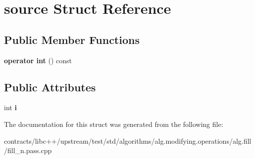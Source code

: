 \hypertarget{structsource}{}\section{source Struct Reference}
\label{structsource}
\subsection*{Public Member Functions}
\begin{DoxyCompactItemize}
\item 
\mbox{\label{structsource_a575578afa5982e4f1df7cc4b5e194e82}} 
{\bfseries operator int} () const
\end{DoxyCompactItemize}
\subsection*{Public Attributes}
\begin{DoxyCompactItemize}
\item 
\mbox{\label{structsource_aedd68f29e8cb20d51f28cd76bf6684ba}} 
int {\bfseries i}
\end{DoxyCompactItemize}


The documentation for this struct was generated from the following file\+:\begin{DoxyCompactItemize}
\item 
contracts/libc++/upstream/test/std/algorithms/alg.\+modifying.\+operations/alg.\+fill/fill\+\_\+n.\+pass.\+cpp\end{DoxyCompactItemize}
